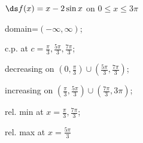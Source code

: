 {$\ds f(x) =x-2 \sin x$ on $0\le x\le3\pi$
}
{domain=$(-\infty,\infty)$;

c.p. at $c=\frac\pi3,\frac{5\pi}3,\frac{7\pi}3$;

decreasing on $(0,\frac\pi3)\cup(\frac{5\pi}3,\frac{7\pi}3)$;

increasing on $(\frac\pi3,\frac{5\pi}3) \cup (\frac{7\pi}3,3\pi)$;

rel. min at $x=\frac\pi3,\frac{7\pi}3$;

rel. max at $x=\frac{5\pi}3$
}
